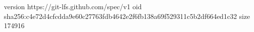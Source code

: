 version https://git-lfs.github.com/spec/v1
oid sha256:c4e72d4cfcdda9e60c27763fdb4642e2f6fb138a69f529311c5b2df664ed1c32
size 174916
